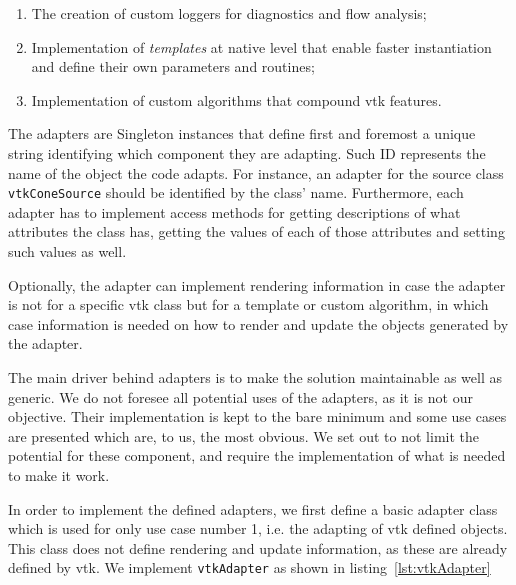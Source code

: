 \begin{enumerate}
    \item The creation of custom loggers for diagnostics and flow analysis;
    \item Implementation of \textit{templates} at native level that enable faster instantiation and define their own parameters and routines;
    \item Implementation of custom algorithms that compound \acrshort{vtk} features.
\end{enumerate}

The adapters are Singleton instances that define first and foremost a unique string identifying which component they are adapting. Such ID represents the name of the object the code adapts. For instance, an adapter for the  source class \verb|vtkConeSource| should be identified by the class' name. Furthermore, each adapter has to implement access methods for getting descriptions of what attributes the class has, getting the values of each of those attributes and setting such values as well. 

Optionally, the adapter can implement rendering information in case the adapter is not for a specific \acrshort{vtk} class but for a template or custom algorithm, in which case information is needed on how to render and update the objects generated by the adapter.

The main driver behind adapters is to make the solution maintainable as well as generic. We do not foresee all potential uses of the adapters, as it is not our objective. Their implementation is kept to the bare minimum and some use cases are presented which are, to us, the most obvious. We set out to not limit the potential for these component, and require the implementation of what is needed to make it work.

In order to implement the defined adapters, we first define a basic adapter class which is used for only use case number 1, i.e. the adapting of \acrshort{vtk} defined objects. This class does not define rendering and update information, as these are already defined by \acrshort{vtk}. We implement \verb|vtkAdapter| as shown in listing~\ref{lst:vtkAdapter}


